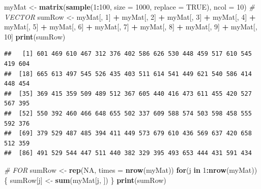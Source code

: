 \documentclass[]{book}
\newenvironment{Shaded}{\begin{snugshade}}{\end{snugshade}}
\newcommand{\CommentTok}[1]{\textcolor[rgb]{0.56,0.35,0.01}{\textit{#1}}}
\newcommand{\ControlFlowTok}[1]{\textcolor[rgb]{0.13,0.29,0.53}{\textbf{#1}}}
\newcommand{\DataTypeTok}[1]{\textcolor[rgb]{0.13,0.29,0.53}{#1}}
\newcommand{\DecValTok}[1]{\textcolor[rgb]{0.00,0.00,0.81}{#1}}
\newcommand{\KeywordTok}[1]{\textcolor[rgb]{0.13,0.29,0.53}{\textbf{#1}}}
\newcommand{\NormalTok}[1]{#1}
\newcommand{\OperatorTok}[1]{\textcolor[rgb]{0.81,0.36,0.00}{\textbf{#1}}}
\newcommand{\OtherTok}[1]{\textcolor[rgb]{0.56,0.35,0.01}{#1}}
\newcommand{\StringTok}[1]{\textcolor[rgb]{0.31,0.60,0.02}{#1}}
\begin{document}
\begin{Shaded}
\begin{Highlighting}[]
\NormalTok{myMat <-}\StringTok{ }\KeywordTok{matrix}\NormalTok{(}\KeywordTok{sample}\NormalTok{(}\DecValTok{1}\OperatorTok{:}\DecValTok{100}\NormalTok{, }\DataTypeTok{size =} \DecValTok{1000}\NormalTok{, }\DataTypeTok{replace =} \OtherTok{TRUE}\NormalTok{), }\DataTypeTok{ncol =} \DecValTok{10}\NormalTok{)}
\CommentTok{# VECTOR}
\NormalTok{sumRow <-}\StringTok{ }\NormalTok{myMat[, }\DecValTok{1}\NormalTok{] }\OperatorTok{+}\StringTok{ }\NormalTok{myMat[, }\DecValTok{2}\NormalTok{] }\OperatorTok{+}\StringTok{ }\NormalTok{myMat[, }\DecValTok{3}\NormalTok{] }\OperatorTok{+}\StringTok{ }\NormalTok{myMat[, }\DecValTok{4}\NormalTok{] }\OperatorTok{+}\StringTok{ }
\StringTok{  }\NormalTok{myMat[, }\DecValTok{5}\NormalTok{] }\OperatorTok{+}\StringTok{ }\NormalTok{myMat[, }\DecValTok{6}\NormalTok{] }\OperatorTok{+}\StringTok{ }\NormalTok{myMat[, }\DecValTok{7}\NormalTok{] }\OperatorTok{+}\StringTok{ }\NormalTok{myMat[, }\DecValTok{8}\NormalTok{] }\OperatorTok{+}\StringTok{ }
\StringTok{  }\NormalTok{myMat[, }\DecValTok{9}\NormalTok{] }\OperatorTok{+}\StringTok{ }\NormalTok{myMat[, }\DecValTok{10}\NormalTok{]}
\KeywordTok{print}\NormalTok{(sumRow)}
\end{Highlighting}
\end{Shaded}

\begin{verbatim}
##   [1] 601 469 610 467 312 376 402 586 626 530 448 459 517 610 545 419 604
##  [18] 665 613 497 545 526 435 403 511 614 541 449 621 540 586 414 448 454
##  [35] 369 415 359 509 489 512 367 605 440 416 473 611 455 420 527 567 395
##  [52] 550 392 460 466 648 655 502 337 609 588 574 503 598 458 555 592 376
##  [69] 379 529 487 485 394 411 449 573 679 610 436 569 637 420 658 512 359
##  [86] 491 529 544 447 511 440 382 329 395 493 653 444 431 591 434
\end{verbatim}

\begin{Shaded}
\begin{Highlighting}[]
\CommentTok{# FOR}
\NormalTok{sumRow <-}\StringTok{ }\KeywordTok{rep}\NormalTok{(}\OtherTok{NA}\NormalTok{, }\DataTypeTok{times =} \KeywordTok{nrow}\NormalTok{(myMat))}
\ControlFlowTok{for}\NormalTok{(j }\ControlFlowTok{in} \DecValTok{1}\OperatorTok{:}\KeywordTok{nrow}\NormalTok{(myMat))\{}
\NormalTok{  sumRow[j] <-}\StringTok{ }\KeywordTok{sum}\NormalTok{(myMat[j, ])}
\NormalTok{\}}
\KeywordTok{print}\NormalTok{(sumRow)}
\end{Highlighting}
\end{Shaded}
\end{document}
